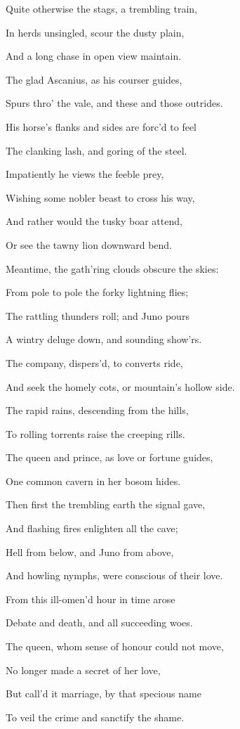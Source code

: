 Quite otherwise the stags, a trembling train,

In herds unsingled, scour the dusty plain,

And a long chase in open view maintain.

The glad Ascanius, as his courser guides,

Spurs thro’ the vale, and these and those outrides.

His horse’s flanks and sides are forc’d to feel

The clanking lash, and goring of the steel.

Impatiently he views the feeble prey,

Wishing some nobler beast to cross his way,

And rather would the tusky boar attend,

Or see the tawny lion downward bend.

Meantime, the gath’ring clouds obscure the skies:

From pole to pole the forky lightning flies;

The rattling thunders roll; and Juno pours

A wintry deluge down, and sounding show’rs.

The company, dispers’d, to converts ride,

And seek the homely cots, or mountain’s hollow side.

The rapid rains, descending from the hills,

To rolling torrents raise the creeping rills.

The queen and prince, as love or fortune guides,

One common cavern in her bosom hides.

Then first the trembling earth the signal gave,

And flashing fires enlighten all the cave;

Hell from below, and Juno from above,

And howling nymphs, were conscious of their love.

From this ill-omen’d hour in time arose

Debate and death, and all succeeding woes.

The queen, whom sense of honour could not move,

No longer made a secret of her love,

But call’d it marriage, by that specious name

To veil the crime and sanctify the shame.

